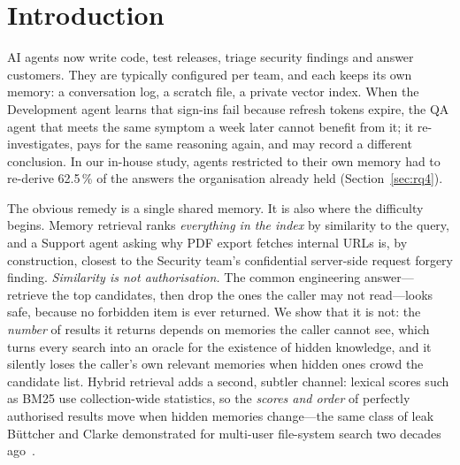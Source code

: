 \documentclass[11pt,a4paper]{article}
\theoremstyle{remark}
\begin{document}
\section{Introduction}

AI agents now write code, test releases, triage security findings and answer customers. They are
typically configured per team, and each keeps its own memory: a conversation log, a scratch file, a private
vector index. When the Development agent learns that sign-ins fail because refresh tokens expire, the QA agent
that meets the same symptom a week later cannot benefit from it; it re-investigates, pays for the same
reasoning again, and may record a different conclusion. In our in-house study, agents restricted to their
own memory had to re-derive 62.5\,\% of the answers the organisation already held (Section~\ref{sec:rq4}).

The obvious remedy is a single shared memory. It is also where the difficulty begins. Memory retrieval
ranks \emph{everything in the index} by similarity to the query, and a Support agent asking why PDF export
fetches internal URLs is, by construction, closest to the Security team's confidential server-side request
forgery finding. \emph{Similarity is not authorisation.} The common engineering answer---retrieve the top
candidates, then drop the ones the caller may not read---looks safe, because no forbidden item is ever
returned. We show that it is not: the \emph{number} of results it returns depends on memories the caller
cannot see, which turns every search into an oracle for the existence of hidden knowledge, and it silently
loses the caller's own relevant memories when hidden ones crowd the candidate list. Hybrid retrieval adds a
second, subtler channel: lexical scores such as BM25 use collection-wide statistics, so the \emph{scores and
order} of perfectly authorised results move when hidden memories change---the same class of leak B{\"u}ttcher and
Clarke demonstrated for multi-user file-system search two decades ago~\cite{buettcher2005security}.
\end{document}
